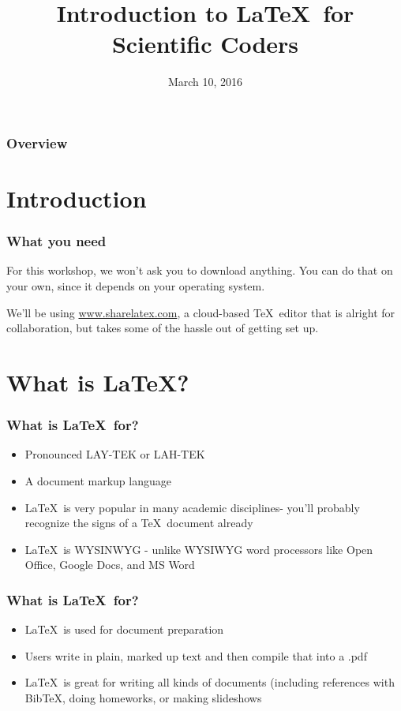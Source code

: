 \documentclass{beamer}
\title[Intro to \LaTeX]{Introduction to \LaTeX\ for Scientific Coders} %
\author{} %
\institute[UofT] %
{
University of Toronto \\ %
\medskip
\textit{curtis.mccord@mail.utoronto.ca} %
}
\date{March 10, 2016} %
\begin{document}
\begin{frame}
\titlepage %
\end{frame}

\begin{frame}
\frametitle{Overview} %
\tableofcontents
\end{frame}

\section{Introduction}

\begin{frame}
\frametitle{What you need}
For this workshop, we won't ask you to download anything. You can do that on your own, since it depends on your operating system. 

We'll be using \url{www.sharelatex.com}, a cloud-based \TeX\ editor that is alright for collaboration, but takes some of the hassle out of getting set up.
\end{frame}
\section{What is \LaTeX?}

\begin{frame}
\frametitle{What is \LaTeX\ for?} 
\begin{itemize}
\item{Pronounced LAY-TEK or LAH-TEK} 
\item{A document markup language}
\item{\LaTeX\ is very popular in many academic disciplines- you'll probably recognize the signs of a \TeX\ document already}
\item{\LaTeX\ is WYSINWYG - unlike WYSIWYG word processors like Open Office, Google Docs, and MS Word}
\end{itemize}
\end{frame}

\begin{frame}
\frametitle{What is  \LaTeX\ for?}
\begin{itemize}
\item{\LaTeX\ is used for document preparation}
\item{Users write in plain, marked up text and then compile that into a .pdf}
\item{\LaTeX\ is great for writing all kinds of documents (including references with BibTeX, doing homeworks, or making slideshows}
\end{itemize}
\end{frame}
\end{document}

